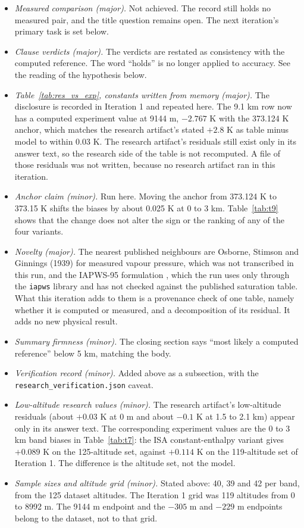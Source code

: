 \documentclass[11pt,letterpaper]{article}
\begin{document}
\begin{itemize}
\item \emph{Measured comparison (major).} Not achieved. The record still holds no measured pair, and the title question remains open. The next iteration's primary task is set below.
\item \emph{Clause verdicts (major).} The verdicts are restated as consistency with the computed reference. The word ``holds'' is no longer applied to accuracy. See the reading of the hypothesis below.
\item \emph{Table~\ref{tab:res_vs_exp}, constants written from memory (major).} The disclosure is recorded in Iteration 1 and repeated here. The 9.1 km row now has a computed experiment value at 9144 m, $-2.767$ K with the 373.124 K anchor, which matches the research artifact's stated $+2.8$ K as table minus model to within 0.03 K. The research artifact's residuals still exist only in its answer text, so the research side of the table is not recomputed. A file of those residuals was not written, because no research artifact ran in this iteration.
\item \emph{Anchor claim (minor).} Run here. Moving the anchor from 373.124 K to 373.15 K shifts the biases by about 0.025 K at 0 to 3 km. Table~\ref{tab:t9} shows that the change does not alter the sign or the ranking of any of the four variants.
\item \emph{Novelty (major).} The nearest published neighbours are Osborne, Stimson and Ginnings (1939) for measured vapour pressure, which was not transcribed in this run, and the IAPWS-95 formulation \cite{ref2}, which the run uses only through the \texttt{iapws} library and has not checked against the published saturation table. What this iteration adds to them is a provenance check of one table, namely whether it is computed or measured, and a decomposition of its residual. It adds no new physical result.
\item \emph{Summary firmness (minor).} The closing section says ``most likely a computed reference'' below 5 km, matching the body.
\item \emph{Verification record (minor).} Added above as a subsection, with the \texttt{research\_\allowbreak verification.json} caveat.
\item \emph{Low-altitude research values (minor).} The research artifact's low-altitude residuals (about $+0.03$ K at 0 m and about $-0.1$ K at 1.5 to 2.1 km) appear only in its answer text. The corresponding experiment values are the 0 to 3 km band biases in Table~\ref{tab:t7}: the ISA constant-enthalpy variant gives $+0.089$ K on the 125-altitude set, against $+0.114$ K on the 119-altitude set of Iteration 1. The difference is the altitude set, not the model.
\item \emph{Sample sizes and altitude grid (minor).} Stated above: 40, 39 and 42 per band, from the 125 dataset altitudes. The Iteration 1 grid was 119 altitudes from 0 to 8992 m. The 9144 m endpoint and the $-305$ m and $-229$ m endpoints belong to the dataset, not to that grid.
\end{itemize}
\end{document}
